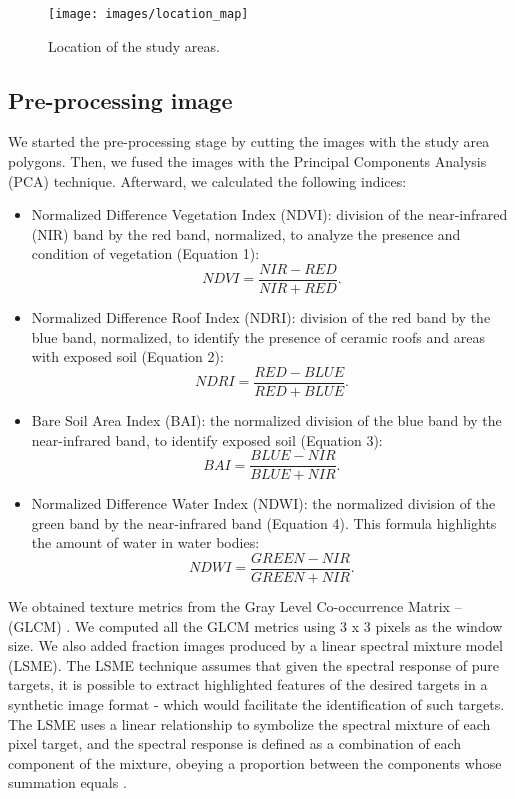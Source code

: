 \documentclass[preprint, 3p,
authoryear]{elsarticle} %
\providecommand{\tightlist}{%
  \setlength{\itemsep}{0pt}\setlength{\parskip}{0pt}}
\begin{document}
\begin{figure}
\texttt{[image: images/location\_map]} \caption{\label{fig:study-area}Location of the study areas.}\label{fig:fig-1}
\end{figure}

\hypertarget{pre-processing-image}{%
\subsection{Pre-processing image}\label{pre-processing-image}}

We started the pre-processing stage by cutting the images with the study
area polygons. Then, we fused the images with the Principal Components
Analysis (PCA) technique. Afterward, we calculated the following
indices:

\begin{itemize}
\tightlist
\item
  Normalized Difference Vegetation Index (NDVI): division of the
  near-infrared (NIR) band by the red band, normalized, to analyze the
  presence and condition of vegetation (Equation 1): \[ 
  NDVI = \frac{NIR - RED}{NIR + RED}.
  \]
\item
  Normalized Difference Roof Index (NDRI): division of the red band by
  the blue band, normalized, to identify the presence of ceramic roofs
  and areas with exposed soil (Equation 2): \[ 
  NDRI = \frac{RED - BLUE}{RED + BLUE}.
  \]
\item
  Bare Soil Area Index (BAI): the normalized division of the blue band
  by the near-infrared band, to identify exposed soil (Equation 3): \[ 
  BAI = \frac{BLUE - NIR}{BLUE + NIR}.
  \]
\item
  Normalized Difference Water Index (NDWI): the normalized division of
  the green band by the near-infrared band (Equation 4). This formula
  highlights the amount of water in water bodies: \[ 
  NDWI = \frac{GREEN - NIR}{GREEN + NIR}.
  \]
\end{itemize}

We obtained texture metrics from the Gray Level Co-occurrence Matrix --
(GLCM) \citep{Haralick1973}. We computed all the GLCM metrics using 3 x
3 pixels as the window size. We also added fraction images produced by a
linear spectral mixture model (LSME). The LSME technique assumes that
given the spectral response of pure targets, it is possible to extract
highlighted features of the desired targets in a synthetic image format
- which would facilitate the identification of such targets. The LSME
uses a linear relationship to symbolize the spectral mixture of each
pixel target, and the spectral response is defined as a combination of
each component of the mixture, obeying a proportion between the
components whose summation equals \citep{Shimabukuro2019}.
\end{document}
